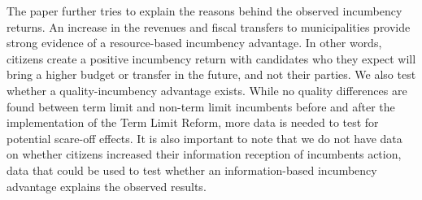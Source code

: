 The paper further tries to explain the reasons behind the observed incumbency returns. An increase in the revenues and fiscal transfers to municipalities provide strong evidence of a resource-based incumbency advantage. In other words, citizens create a positive incumbency return with candidates who they expect will bring a higher budget or transfer in the future, and not their parties. We also test whether a quality-incumbency advantage exists. While no quality differences are found between term limit and non-term limit incumbents before and after the implementation of the Term Limit Reform, more data is needed to test for potential scare-off effects. It is also important to note that we do not have data on whether citizens increased their information reception of incumbents action, data that could be used to test whether an information-based incumbency advantage explains the observed results.
